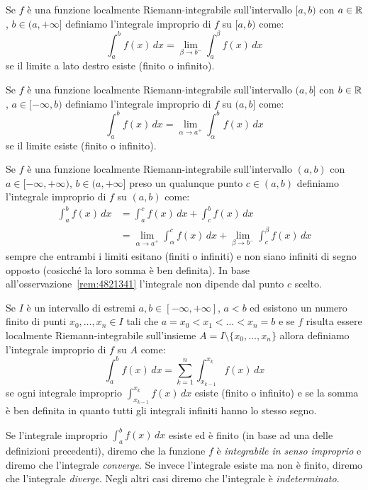 \begin{definition}
\label{def:integrale_improprio}
Se $f$ è una funzione localmente Riemann-integrabile sull'intervallo $[a,b)$
con $a\in \mathbb R$, $b\in (a,+\infty]$ definiamo l'integrale improprio
di $f$ su $[a,b)$ come:
\[
  \int_a^b f(x)\, dx = \lim_{\beta \to b^-} \int_a^\beta f(x)\, dx
\]
se il limite a lato destro esiste (finito o infinito).

Se $f$ è una funzione localmente Riemann-integrabile sull'intervallo $(a,b]$
con $b\in \mathbb R$, $a\in [-\infty,b)$ definiamo l'integrale improprio
di $f$ su $(a,b]$ come:
\[
  \int_a^b f(x)\, dx = \lim_{\alpha \to a^+} \int_\alpha^b f(x)\, dx
\]
se il limite esiste (finito o infinito).

Se $f$ è una funzione localmente Riemann-integrabile sull'intervallo $(a,b)$
con $a\in [-\infty,+\infty)$, $b\in(a,+\infty]$ preso un qualunque
punto $c\in (a,b)$
definiamo l'integrale improprio di $f$ su $(a,b)$ come:
\begin{align*}
  \int_a^b f(x)\, dx &=
  \int_a^c f(x)\, dx + \int_c^b f(x)\, dx \\
  &= \lim_{\alpha \to a^+}\int_\alpha^c f(x)\,dx
    + \lim_{\beta\to b^-}\int_c^\beta f(x)\, dx
\end{align*}
sempre che entrambi i limiti esitano (finiti o infiniti) e non siano infiniti
di segno opposto (cosicché la loro somma è ben definita). In base
all'osservazione~\ref{rem:4821341} l'integrale non dipende
dal punto $c$ scelto.

Se $I$ è un intervallo di estremi $a,b\in [-\infty, +\infty]$, $a<b$
ed esistono un numero finito di punti $x_0,\dots,x_n \in I$ tali che
$a = x_0 < x_1 < \dots < x_n = b$ e se
$f$ risulta essere localmente Riemann-integrabile sull'insieme
$A=I\setminus\{x_0, \dots, x_n\}$ allora definiamo
l'integrale improprio di $f$ su $A$ come:
\[
  \int_a^b f(x)\, dx = \sum_{k=1}^n \int_{x_{k-1}}^{x_k} f(x)\, dx
\]
se ogni integrale improprio $\int_{x_{k-1}}^{x_k} f(x)\, dx$ esiste (finito o infinito)
e se la somma è ben definita in quanto tutti gli integrali infiniti
hanno lo stesso segno.

Se l'integrale improprio $\int_a^b f(x)\, dx$ esiste ed è finito
(in base ad una delle definizioni precedenti), diremo che
la funzione $f$ è
\emph{integrabile in senso improprio}
e diremo che l'integrale \emph{converge}.
%
%
%
%
Se invece l'integrale esiste ma non è finito, diremo che l'integrale
\emph{diverge}.
%
%
%
%
Negli altri casi diremo che l'integrale è
\emph{indeterminato}.
%
%
%


\end{definition}
